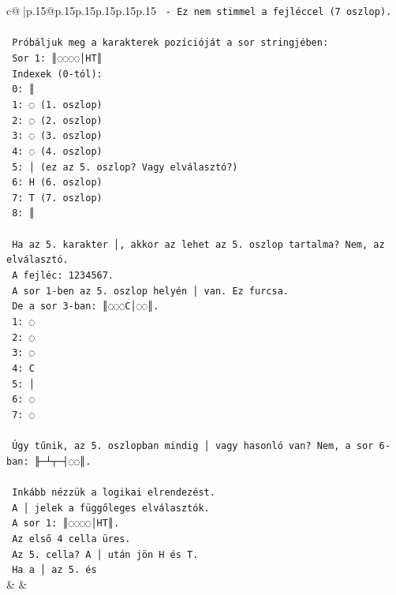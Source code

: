 \documentclass{article}
\begin{document}
{\begin{supertabular}{c@{$\;$}|p{.15\linewidth}@{}p{.15\linewidth}p{.15\linewidth}p{.15\linewidth}p{.15\linewidth}p{.15\linewidth}}
{{{\texttt{        {-} Ez nem stimmel a fejléccel (7 oszlop).} \\
\\ 
\texttt{      Próbáljuk meg a karakterek pozícióját a sor stringjében:} \\
\texttt{      Sor 1: ║◌◌◌◌│HT║} \\
\texttt{      Indexek (0{-}tól):} \\
\texttt{      0: ║} \\
\texttt{      1: ◌ (1. oszlop)} \\
\texttt{      2: ◌ (2. oszlop)} \\
\texttt{      3: ◌ (3. oszlop)} \\
\texttt{      4: ◌ (4. oszlop)} \\
\texttt{      5: │ (ez az 5. oszlop? Vagy elválasztó?)} \\
\texttt{      6: H (6. oszlop)} \\
\texttt{      7: T (7. oszlop)} \\
\texttt{      8: ║} \\
\\ 
\texttt{      Ha az 5. karakter │, akkor az lehet az 5. oszlop tartalma? Nem, az elválasztó.} \\
\texttt{      A fejléc: 1234567.} \\
\texttt{      A sor 1{-}ben az 5. oszlop helyén │ van. Ez furcsa.} \\
\texttt{      De a sor 3{-}ban: ║◌◌◌C│◌◌║.} \\
\texttt{      1: ◌} \\
\texttt{      2: ◌} \\
\texttt{      3: ◌} \\
\texttt{      4: C} \\
\texttt{      5: │} \\
\texttt{      6: ◌} \\
\texttt{      7: ◌} \\
\\ 
\texttt{      Úgy tűnik, az 5. oszlopban mindig │ vagy hasonló van? Nem, a sor 6{-}ban: ╟─┴┬─┤◌◌║.} \\
\\ 
\texttt{      Inkább nézzük a logikai elrendezést.} \\
\texttt{      A │ jelek a függőleges elválasztók.} \\
\texttt{      A sor 1: ║◌◌◌◌│HT║.} \\
\texttt{      Az első 4 cella üres.} \\
\texttt{      Az 5. cella? A │ után jön H és T.} \\
\texttt{      Ha a │ az 5. és} \\
            }
        }
    }
    & & \\ \\


\end{supertabular}}
\end{document}
